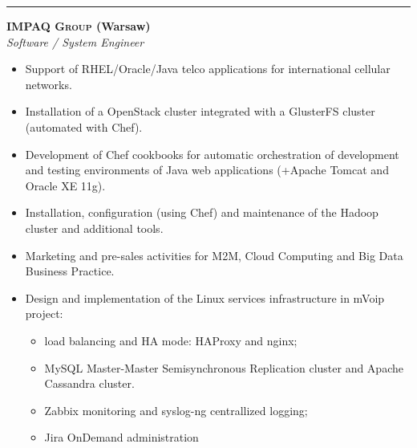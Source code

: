 \documentclass[$fontsize$, a4paper]{article}
\newcommand{\note}[1]{\marginnote{\scriptsize #1}}
\begin{document}
\noindent\rule[0.5ex]{\linewidth}{1pt}

\note{11/2011--01/2014}\textbf{\textsc{IMPAQ Group} (Warsaw)}\\
\emph{Software / System Engineer}
\begin{itemize}
  \item Support of RHEL/Oracle/Java telco applications for international cellular networks.
  \item Installation of a OpenStack cluster integrated with a GlusterFS cluster (automated with Chef).
  \item Development of Chef cookbooks for automatic orchestration of development and testing environments of Java web applications (+Apache Tomcat and Oracle XE 11g).
  \item Installation, configuration (using Chef) and maintenance of the Hadoop cluster and additional tools.
  \item Marketing and pre-sales activities for M2M, Cloud Computing and Big Data Business Practice.

  \item Design and implementation of the Linux services infrastructure in mVoip project:
  \begin{itemize}
    \item load balancing and HA mode: HAProxy and nginx;
    \item MySQL Master-Master Semisynchronous Replication cluster and Apache Cassandra cluster.
    \item Zabbix monitoring and syslog-ng centrallized logging;
    \item Jira OnDemand administration
  \end{itemize}

\end{itemize}






\end{document}
